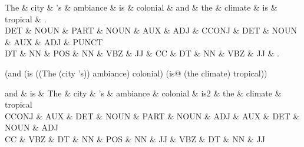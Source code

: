 
\begin{dependency}
\begin{deptext}
The \& city \& 's \& ambiance \& is \& colonial \& and \& the \& climate \& is \& tropical \& . \\
DET \& NOUN \& PART \& NOUN \& AUX \& ADJ \& CCONJ \& DET \& NOUN \& AUX \& ADJ \& PUNCT \\
DT \& NN \& POS \& NN \& VBZ \& JJ \& CC \& DT \& NN \& VBZ \& JJ \& . \\
\end{deptext}



\end{dependency}

(and (is ((The (city 's)) ambiance) colonial) (is{\arrwhich}@ (the climate) tropical))

\begin{dependency}
\begin{deptext}
and \& is \& The \& city \& 's \& ambiance \& colonial \& is{\arrwhich}2 \& the \& climate \& tropical \\
CCONJ \& AUX \& DET \& NOUN \& PART \& NOUN \& ADJ \& AUX \& DET \& NOUN \& ADJ \\
CC \& VBZ \& DT \& NN \& POS \& NN \& JJ \& VBZ \& DT \& NN \& JJ \\
\end{deptext}



\end{dependency}
